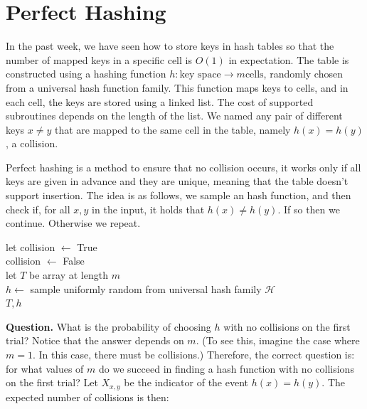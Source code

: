 \ifdefined\BOOK

\section{Perfect Hashing}
In the past week, we have seen how to store keys in hash tables so that the number of mapped keys in a specific cell is $O(1)$ in expectation. The table is constructed using a hashing function $h : \text{key space} \rightarrow m \text{cells}$, randomly chosen from a universal hash function family. This function maps keys to cells, and in each cell, the keys are stored using a linked list. The cost of supported subroutines depends on the length of the list. We named any pair of different keys $x\neq y$ that are mapped to the same cell in the table, namely $h(x) = h(y)$, a collision.

Perfect hashing is a method to ensure that no collision occurs, it works only if all keys are given in advance and they are unique, meaning that the table doesn't support insertion. The idea is as follows, we sample an hash function, and then check if, for all $x,y$ in the input, it holds that $h(x)\neq h(y)$. If so then we continue. Otherwise we repeat. 

  \begin{algorithm}
  \caption{perfect-hashing($x_{1},x_{2},..x_{n}$)}
  let collision $\leftarrow$ True\\
   {
    collision $\leftarrow$ False\\
    let $T$ be array at length $m$ \\
    $h \leftarrow $ sample uniformly random from universal hash family $\mathcal{H}$\\
  }
  \Return $T,h$
  \end{algorithm}

  \textbf{Question.} What is the probability of choosing $h$ with no collisions on the first trial? Notice that the answer depends on $m$. (To see this, imagine the case where $m=1$. In this case, there must be collisions.) Therefore, the correct question is: for what values of $m$ do we succeed in finding a hash function with no collisions on the first trial? Let $X_{x,y}$ be the indicator of the event $h(x)=h(y)$. The expected number of collisions is then:

